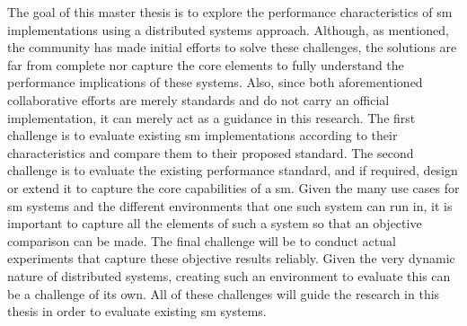 The goal of this master thesis is to explore the performance characteristics of \gls{sm} implementations using a distributed systems approach. Although, as mentioned, the community has made initial efforts to solve these challenges, the solutions are far from complete nor capture the core elements to fully understand the performance implications of these systems. Also, since both aforementioned collaborative efforts are merely standards and do not carry an official implementation, it can merely act as a guidance in this research. The first challenge is to evaluate existing \gls{sm} implementations according to their characteristics and compare them to their proposed standard. The second challenge is to evaluate the existing performance standard, and if required, design or extend it to capture the core capabilities of a \gls{sm}. Given the many use cases for \gls{sm} systems and the different environments that one such system can run in, it is important to capture all the elements of such a system so that an objective comparison can be made. The final challenge will be to conduct actual experiments that capture these objective results reliably. Given the very dynamic nature of distributed systems, creating such an environment to evaluate this can be a challenge of its own. All of these challenges will guide the research in this thesis in order to evaluate existing \gls{sm} systems.